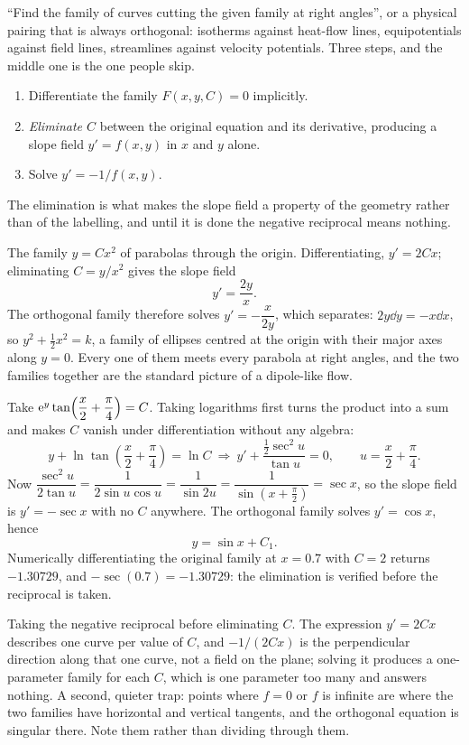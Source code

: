 \cue ``Find the family of curves cutting the given family at right angles'', or a physical pairing that is always orthogonal: isotherms against heat-flow lines, equipotentials against field lines, streamlines against velocity potentials.
\method Three steps, and the middle one is the one people skip.
\begin{enumerate}
\item Differentiate the family $F(x,y,C)=0$ implicitly.
\item \emph{Eliminate $C$} between the original equation and its derivative, producing a slope field $y'=f(x,y)$ in $x$ and $y$ alone.
\item Solve $y'=-1/f(x,y)$.
\end{enumerate}
The elimination is what makes the slope field a property of the geometry rather than of the labelling, and until it is done the negative reciprocal means nothing.

\begin{worked}
The family $y=Cx^{2}$ of parabolas through the origin. Differentiating, $y'=2Cx$; eliminating $C=y/x^{2}$ gives the slope field
\[y'=\frac{2y}{x}.\]
The orthogonal family therefore solves $y'=-\dfrac{x}{2y}$, which separates: $2y\dd y=-x\dd x$, so $y^{2}+\tfrac12x^{2}=k$, a family of ellipses centred at the origin with their major axes along $y=0$. Every one of them meets every parabola at right angles, and the two families together are the standard picture of a dipole-like flow.
\end{worked}

\begin{worked}
Take $\mathrm{e}^{y}\tan\!\left(\dfrac x2+\dfrac\pi4\right)=C$. Taking logarithms first turns the product into a sum and makes $C$ vanish under differentiation without any algebra:
\[y+\ln\tan\!\left(\frac x2+\frac\pi4\right)=\ln C\ \Longrightarrow\ y'+\frac{\tfrac12\sec^{2}u}{\tan u}=0,\qquad u=\frac x2+\frac\pi4.\]
Now $\dfrac{\sec^{2}u}{2\tan u}=\dfrac{1}{2\sin u\cos u}=\dfrac{1}{\sin2u}=\dfrac{1}{\sin(x+\tfrac\pi2)}=\sec x$, so the slope field is $y'=-\sec x$ with no $C$ anywhere. The orthogonal family solves $y'=\cos x$, hence
\[y=\sin x+C_1.\]
Numerically differentiating the original family at $x=0.7$ with $C=2$ returns $-1.30729$, and $-\sec(0.7)=-1.30729$: the elimination is verified before the reciprocal is taken.
\end{worked}

\begin{trap}
Taking the negative reciprocal before eliminating $C$. The expression $y'=2Cx$ describes one curve per value of $C$, and $-1/(2Cx)$ is the perpendicular direction along that one curve, not a field on the plane; solving it produces a one-parameter family for each $C$, which is one parameter too many and answers nothing. A second, quieter trap: points where $f=0$ or $f$ is infinite are where the two families have horizontal and vertical tangents, and the orthogonal equation is singular there. Note them rather than dividing through them.
\end{trap}

